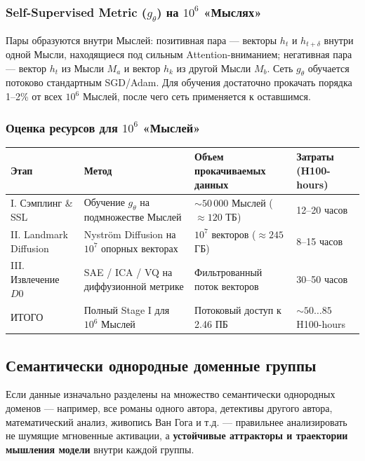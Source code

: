 \documentclass[11pt,a4paper]{article}
\begin{document}
\subsubsection*{Self-Supervised Metric ($g_\theta$) на $10^6$ «Мыслях»}

Пары образуются внутри Мыслей: позитивная пара — векторы $h_t$ и $h_{t+\delta}$ внутри одной Мысли, находящиеся под сильным Attention-вниманием; негативная пара — вектор $h_t$ из Мысли $M_a$ и вектор $h_k$ из другой Мысли $M_b$. Сеть $g_\theta$ обучается потоково стандартным SGD/Adam. Для обучения достаточно прокачать порядка 1--2\% от всех $10^6$ Мыслей, после чего сеть применяется к оставшимся.

\subsubsection*{Оценка ресурсов для $10^6$ «Мыслей»}

\begin{table}[H]
\centering
\small
\begin{tabular}{p{3.0cm} p{5.4cm} p{3.4cm} p{3.0cm}}
\toprule
\textbf{Этап} & \textbf{Метод} & \textbf{Объем прокачиваемых данных} & \textbf{Затраты (H100-hours)} \\
\midrule
I. Сэмплинг \& SSL & Обучение $g_\theta$ на подмножестве Мыслей & $\sim50\,000$ Мыслей ($\approx120$ ТБ) & 12--20 часов \\
II. Landmark Diffusion & Nyström Diffusion на $10^7$ опорных векторах & $10^7$ векторов ($\approx245$ ГБ) & 8--15 часов \\
III. Извлечение $D0$ & SAE / ICA / VQ на диффузионной метрике & Фильтрованный поток векторов & 30--50 часов \\
\midrule
ИТОГО & Полный Stage I для $10^6$ Мыслей & Потоковый доступ к 2.46 ПБ & $\sim50\ldots85$ H100-hours \\
\bottomrule
\end{tabular}
\end{table}

\subsection*{Семантически однородные доменные группы}

Если данные изначально разделены на множество семантически однородных доменов — например, все романы одного автора, детективы другого автора, математический анализ, живопись Ван Гога и т.д. — правильнее анализировать не шумящие мгновенные активации, а \textbf{устойчивые аттракторы и траектории мышления модели} внутри каждой группы.
\end{document}
